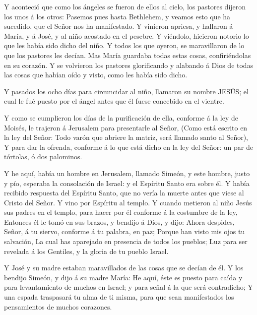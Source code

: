  Y aconteció que como los ángeles se fueron de ellos al
cielo, los pastores dijeron los unos á los otros: Pasemos pues hasta
Bethlehem, y veamos esto que ha sucedido, que el Señor nos ha
manifestado.  Y vinieron apriesa, y hallaron á María, y á
José, y al niño acostado en el pesebre.  Y viéndolo,
hicieron notorio lo que les había sido dicho del niño.  Y
todos los que oyeron, se maravillaron de lo que los pastores les decían.
 Mas María guardaba todas estas cosas, confiriéndolas en su
corazón.  Y se volvieron los pastores glorificando y
alabando á Dios de todas las cosas que habían oído y visto, como les
había sido dicho.

 Y pasados los ocho días para circuncidar al niño, llamaron
su nombre JESÚS; el cual le fué puesto por el ángel antes que él fuese
concebido en el vientre.

 Y como se cumplieron los días de la purificación de ella,
conforme á la ley de Moisés, le trajeron á Jerusalem para presentarle al
Señor,  (Como está escrito en la ley del Señor: Todo varón
que abriere la matriz, será llamado santo al Señor),  Y
para dar la ofrenda, conforme á lo que está dicho en la ley del Señor:
un par de tórtolas, ó dos palominos.

 Y he aquí, había un hombre en Jerusalem, llamado Simeón, y
este hombre, justo y pío, esperaba la consolación de Israel: y el
Espíritu Santo era sobre él.  Y había recibido respuesta
del Espíritu Santo, que no vería la muerte antes que viese al Cristo del
Señor.  Y vino por Espíritu al templo. Y cuando metieron al
niño Jesús sus padres en el templo, para hacer por él conforme á la
costumbre de la ley,  Entonces él le tomó en sus brazos, y
bendijo á Dios, y dijo:  Ahora despides, Señor, á tu
siervo, conforme á tu palabra, en paz;  Porque han visto
mis ojos tu salvación,  La cual has aparejado en presencia
de todos los pueblos;  Luz para ser revelada á los
Gentiles, y la gloria de tu pueblo Israel.

 Y José y su madre estaban maravillados de las cosas que se
decían de él.  Y los bendijo Simeón, y dijo á su madre
María: He aquí, éste es puesto para caída y para levantamiento de muchos
en Israel; y para señal á la que será contradicho;  Y una
espada traspasará tu alma de ti misma, para que sean manifestados los
pensamientos de muchos corazones.

